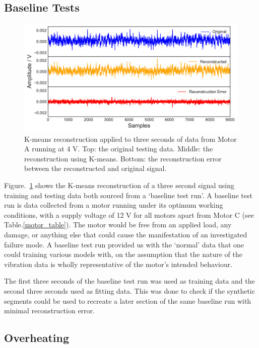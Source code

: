 \subsection{Baseline Tests}

\begin{figure}[t]
    \includegraphics[width=1.0\textwidth]{fig/kmeans_large_4Vnowater.pdf}
    \caption[K-means Large Motor Reconstruction No Water]{K-means reconstruction applied to three seconds of data from Motor A running at 4 V. Top: the original testing data. Middle: the reconstruction using K-means. Bottom: the reconstruction error between the reconstructed and original signal.}
    \label{fig:kmeans_large4V}
\end{figure}

Figure.~\ref{fig:kmeans_large4V} shows the K-means reconstruction of a three second signal using training and testing data both sourced from a `baseline test run'. A baseline test run is data collected from a motor running under its optimum working conditions, with a supply voltage of 12 V for all motors apart from Motor C (see Table.\ref{motor_table}). The motor would be free from an applied load, any damage, or anything else that could cause the manifestation of an investigated failure mode. A baseline test run provided us with the `normal' data that one could training various models with, on the assumption that the nature of the vibration data is wholly representative of the motor's intended behaviour.

The first three seconds of the baseline test run was used as training data and the second three seconds used as fitting data. This was done to check if the synthetic segments could be used to recreate a later section of the same baseline run with minimal reconstruction error. 

\subsection{Overheating}

